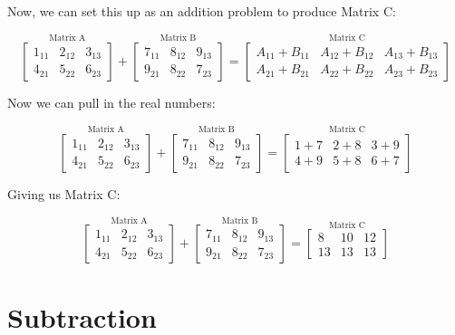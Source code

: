 \documentclass[
  letterpaper,
]{krantz}
\begin{document}
Now, we can set this up as an addition problem to produce Matrix C:

\[
\stackrel{\mbox{Matrix A}}{
\begin{bmatrix}
1_{11} & 2_{12} & 3_{13}\\
4_{21} & 5_{22} & 6_{23}
\end{bmatrix}
}  
+ 
\stackrel{\mbox{Matrix B}}{
\begin{bmatrix}
7_{11} & 8_{12} & 9_{13}\\
9_{21} & 8_{22} & 7_{23}
\end{bmatrix} 
}
=
\stackrel{\mbox{Matrix C}}{
\begin{bmatrix}
A_{11} + B_{11}& A_{12} + B_{12} & A_{13} + B_{13}\\
A_{21} + B_{21}& A_{22} + B_{22} & A_{23} + B_{23}
\end{bmatrix}
}
\]

Now we can pull in the real numbers:

\[
\stackrel{\mbox{Matrix A}}{
\begin{bmatrix}
1_{11} & 2_{12} & 3_{13}\\
4_{21} & 5_{22} & 6_{23}
\end{bmatrix}
}  
+ 
\stackrel{\mbox{Matrix B}}{
\begin{bmatrix}
7_{11} & 8_{12} & 9_{13}\\
9_{21} & 8_{22} & 7_{23}
\end{bmatrix} 
}
=
\stackrel{\mbox{Matrix C}}{
\begin{bmatrix}
1 + 7  & 2 + 8 & 3 + 9\\
4 + 9 & 5 + 8 & 6 + 7
\end{bmatrix}
}
\]

Giving us Matrix C:

\[
\stackrel{\mbox{Matrix A}}{
\begin{bmatrix}
1_{11} & 2_{12} & 3_{13}\\
4_{21} & 5_{22} & 6_{23}
\end{bmatrix}
}  
+ 
\stackrel{\mbox{Matrix B}}{
\begin{bmatrix}
7_{11} & 8_{12} & 9_{13}\\
9_{21} & 8_{22} & 7_{23}
\end{bmatrix} 
}
=
\stackrel{\mbox{Matrix C}}{
\begin{bmatrix}
8 & 10 & 12 \\
13 & 13 & 13
\end{bmatrix}
}
\]

\section{Subtraction}\label{subtraction}
\end{document}
